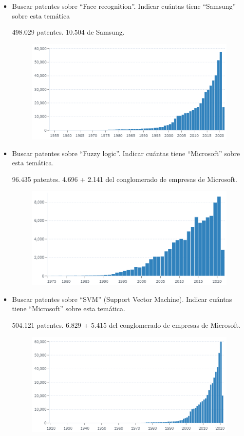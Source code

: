 \begin{itemize}
    \item Buscar patentes sobre “Face recognition”. Indicar cuántas tiene “Samsung” sobre esta temática

    498.029 patentes. 10.504 de Samsung.

    \begin{figure}[H]
        \centering
        \includegraphics[width=.8\textwidth]{img/patentes/2a.png}
    \end{figure}

    \item Buscar patentes sobre “Fuzzy logic”. Indicar cuántas tiene “Microsoft” sobre esta temática.

    96.435 patentes. 4.696 + 2.141 del conglomerado de empresas de Microsoft.

    \begin{figure}[H]
        \centering
        \includegraphics[width=.8\textwidth]{img/patentes/2b.png}
    \end{figure}

    \item Buscar patentes sobre “SVM” (Support Vector Machine). Indicar cuántas tiene “Microsoft” sobre esta temática.
    
    504.121 patentes. 6.829 + 5.415 del conglomerado de empresas de Microsoft.

    \begin{figure}[H]
        \centering
        \includegraphics[width=.8\textwidth]{img/patentes/2c.png}
    \end{figure}
\end{itemize}

